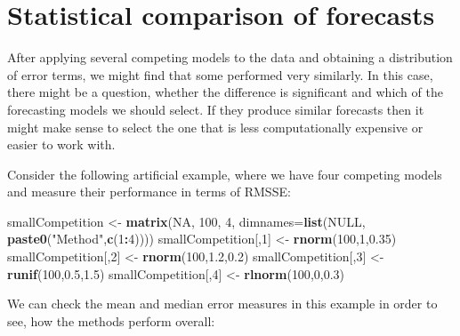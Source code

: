 \documentclass[]{book}
\newenvironment{Shaded}{\begin{snugshade}}{\end{snugshade}}
\newcommand{\DataTypeTok}[1]{\textcolor[rgb]{0.13,0.29,0.53}{#1}}
\newcommand{\DecValTok}[1]{\textcolor[rgb]{0.00,0.00,0.81}{#1}}
\newcommand{\FloatTok}[1]{\textcolor[rgb]{0.00,0.00,0.81}{#1}}
\newcommand{\KeywordTok}[1]{\textcolor[rgb]{0.13,0.29,0.53}{\textbf{#1}}}
\newcommand{\NormalTok}[1]{#1}
\newcommand{\OperatorTok}[1]{\textcolor[rgb]{0.81,0.36,0.00}{\textbf{#1}}}
\newcommand{\OtherTok}[1]{\textcolor[rgb]{0.56,0.35,0.01}{#1}}
\newcommand{\StringTok}[1]{\textcolor[rgb]{0.31,0.60,0.02}{#1}}
\theoremstyle{definition}
\theoremstyle{definition}
\theoremstyle{definition}
\theoremstyle{definition}
\theoremstyle{remark}
\begin{document}
\hypertarget{statisticalTests}{%
\section{Statistical comparison of forecasts}\label{statisticalTests}}

After applying several competing models to the data and obtaining a distribution of error terms, we might find that some performed very similarly. In this case, there might be a question, whether the difference is significant and which of the forecasting models we should select. If they produce similar forecasts then it might make sense to select the one that is less computationally expensive or easier to work with.

Consider the following artificial example, where we have four competing models and measure their performance in terms of RMSSE:

\begin{Shaded}
\begin{Highlighting}[]
\NormalTok{smallCompetition <-}\StringTok{ }\KeywordTok{matrix}\NormalTok{(}\OtherTok{NA}\NormalTok{, }\DecValTok{100}\NormalTok{, }\DecValTok{4}\NormalTok{,}
                           \DataTypeTok{dimnames=}\KeywordTok{list}\NormalTok{(}\OtherTok{NULL}\NormalTok{,}
                                         \KeywordTok{paste0}\NormalTok{(}\StringTok{"Method"}\NormalTok{,}\KeywordTok{c}\NormalTok{(}\DecValTok{1}\OperatorTok{:}\DecValTok{4}\NormalTok{))))}
\NormalTok{smallCompetition[,}\DecValTok{1}\NormalTok{] <-}\StringTok{ }\KeywordTok{rnorm}\NormalTok{(}\DecValTok{100}\NormalTok{,}\DecValTok{1}\NormalTok{,}\FloatTok{0.35}\NormalTok{)}
\NormalTok{smallCompetition[,}\DecValTok{2}\NormalTok{] <-}\StringTok{ }\KeywordTok{rnorm}\NormalTok{(}\DecValTok{100}\NormalTok{,}\FloatTok{1.2}\NormalTok{,}\FloatTok{0.2}\NormalTok{)}
\NormalTok{smallCompetition[,}\DecValTok{3}\NormalTok{] <-}\StringTok{ }\KeywordTok{runif}\NormalTok{(}\DecValTok{100}\NormalTok{,}\FloatTok{0.5}\NormalTok{,}\FloatTok{1.5}\NormalTok{)}
\NormalTok{smallCompetition[,}\DecValTok{4}\NormalTok{] <-}\StringTok{ }\KeywordTok{rlnorm}\NormalTok{(}\DecValTok{100}\NormalTok{,}\DecValTok{0}\NormalTok{,}\FloatTok{0.3}\NormalTok{)}
\end{Highlighting}
\end{Shaded}

We can check the mean and median error measures in this example in order to see, how the methods perform overall:
\end{document}
